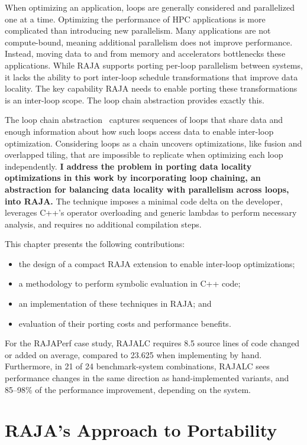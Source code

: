When optimizing an application, loops are generally considered and
parallelized one at a time.
Optimizing the performance of HPC applications is more complicated than introducing new parallelism.
Many applications are not compute-bound, meaning additional parallelism does not improve performance. 
Instead, moving data to and from memory and accelerators bottlenecks these applications. 
While RAJA supports porting per-loop parallelism between systems, it lacks the ability to port inter-loop schedule transformations that improve data locality. 
The key capability RAJA needs to enable porting these transformations is an inter-loop scope.
The loop chain abstraction provides exactly this.

The loop chain abstraction~\cite{krieger2013loop} captures sequences of loops that share 
data and enough information about how such loops access 
data to enable inter-loop optimization.
Considering loops as a chain uncovers optimizations, like fusion
and overlapped tiling, that are impossible to replicate when optimizing
each loop independently.
\textbf{I address the problem in porting data locality optimizations in this
work by incorporating loop chaining, an abstraction for balancing data locality
with parallelism across loops, into RAJA.}
The technique imposes a minimal code delta on the developer, leverages C++'s
operator overloading and generic lambdas to perform necessary analysis, and
requires no additional compilation steps.

This chapter presents the following contributions:
\begin{itemize}
\item the design of a compact RAJA extension to enable inter-loop
			optimizations;
\item a methodology to perform symbolic evaluation in C++ code;
\item an implementation of these techniques in RAJA\@; and
\item evaluation of their porting costs and performance benefits.
\end{itemize}

For the RAJAPerf case study, RAJALC requires 8.5 source lines of code changed or added on average, compared to 23.625 when implementing by hand.
Furthermore, in 21 of 24 benchmark-system combinations, RAJALC sees performance changes in the same direction as hand-implemented variants, and 85--98\% of the performance improvement, depending on the system.

\section{RAJA's Approach to Portability}

